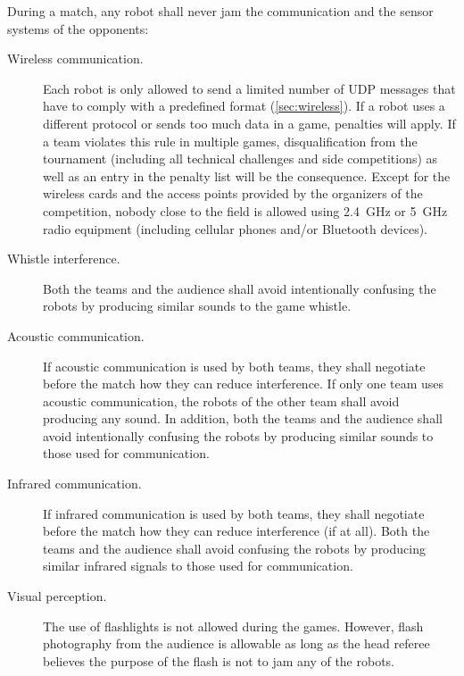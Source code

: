 During a match, any robot shall never jam the communication and the sensor systems of the opponents:
\begin{description}
  \item[Wireless communication.] Each robot is only allowed to send a limited number of UDP messages that have to comply with a predefined format (\cf \cref{sec:wireless}).
    If a robot uses a different protocol or sends too much data in a game, penalties will apply.
    If a team violates this rule in multiple games, disqualification from the tournament (including all technical challenges and side competitions) as well as an entry in the penalty list will be the consequence.
    Except for the wireless cards and the access points provided by the organizers of the competition, nobody close to the field is allowed using \qty{2.4}{\giga\hertz} or \qty{5}{\giga\hertz} radio equipment (including cellular phones and/or Bluetooth devices).
  \item[Whistle interference.] Both the teams and the audience shall avoid intentionally confusing the robots by producing similar sounds to the game whistle.
  \item[Acoustic communication.] If acoustic communication is used by both teams, they shall negotiate before the match how they can reduce interference.
    If only one team uses acoustic communication, the robots of the other team shall avoid producing any sound.
    In addition, both the teams and the audience shall avoid intentionally confusing the robots by producing similar sounds to those used for communication.
  \item[Infrared communication.] If infrared communication is used by both teams, they shall negotiate before the match how they can reduce interference (if at all).
    Both the teams and the audience shall avoid confusing the robots by producing similar infrared signals to those used for communication.
  \item[Visual perception.] The use of flashlights is not allowed during the games.
    However, flash photography from the audience is allowable as long as the head referee believes the purpose of the flash is not to jam any of the robots.
\end{description}

